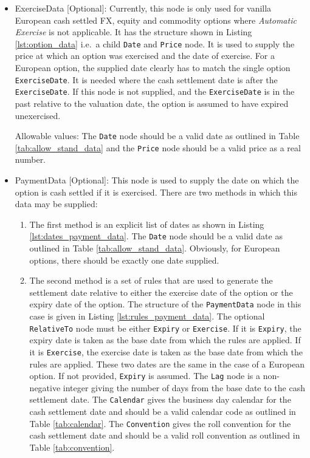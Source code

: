 \begin{itemize}
\item ExerciseData [Optional]: Currently, this node is only used for vanilla European cash settled FX, equity and commodity options where \textit{Automatic Exercise} is not applicable. It has the structure shown in Listing \ref{lst:option_data} i.e.\ a child \lstinline!Date! and \lstinline!Price! node. It is used to supply the price at which an option was exercised and the date of exercise. For a European option, the supplied date clearly has to match the single option \lstinline!ExerciseDate!. It is needed where the cash settlement date is after the \lstinline!ExerciseDate!. If this node is not supplied, and the \lstinline!ExerciseDate! is in the past relative to the valuation date, the option is assumed to have expired unexercised.

Allowable values: The \lstinline!Date! node should be a valid date as outlined in Table \ref{tab:allow_stand_data} and the \lstinline!Price! node should be a valid price as a real number.

\item PaymentData [Optional]:  This node is used to supply the date on which the option is cash settled if it is exercised. There are two methods in which this data may be supplied:

\begin{enumerate}
\item
The first method is an explicit list of dates as shown in Listing \ref{lst:dates_payment_data}. The \lstinline!Date! node should be a valid date as outlined in Table \ref{tab:allow_stand_data}. Obviously, for European options, there should be exactly one date supplied.

\item
The second method is a set of rules that are used to generate the settlement date relative to either the exercise date of the option or the expiry date of the option. The structure of the \lstinline!PaymentData! node in this case is given in Listing \ref{lst:rules_payment_data}. The optional \lstinline!RelativeTo! node must be either \lstinline!Expiry! or \lstinline!Exercise!. If it is \lstinline!Expiry!, the expiry date is taken as the base date from which the rules are applied. If it is \lstinline!Exercise!, the exercise date is taken as the base date from which the rules are applied. These two dates are the same in the case of a European option. If not provided, \lstinline!Expiry! is assumed. The \lstinline!Lag! node is a non-negative integer giving the number of days from the base date to the cash settlement date. The \lstinline!Calendar! gives the business day calendar for the cash settlement date and should be a valid calendar code as outlined in Table \ref{tab:calendar}. The \lstinline!Convention! gives the roll convention for the cash settlement date and should be a valid roll convention as outlined in Table \ref{tab:convention}.

\end{enumerate}

\end{itemize}

